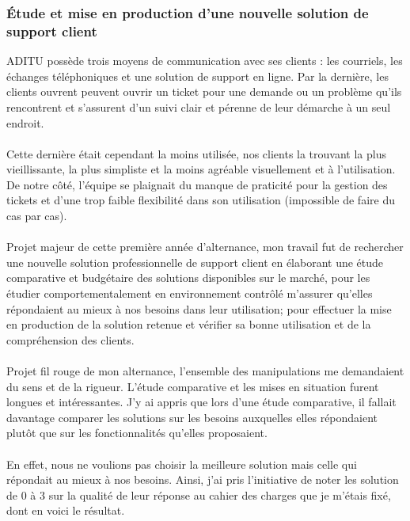 \subsubsection{Étude et mise en production d'une nouvelle solution de support client}

ADITU possède trois moyens de communication avec ses clients : les courriels, les échanges téléphoniques et une solution de support en ligne. Par la dernière, les clients ouvrent peuvent ouvrir un ticket pour une demande ou un problème qu'ils rencontrent et s'assurent d'un suivi clair et pérenne de leur démarche à un seul endroit.
\\ \\
Cette dernière était cependant la moins utilisée, nos clients la trouvant la plus vieillissante, la plus simpliste et la moins agréable visuellement et à l’utilisation. De notre côté, l'équipe se plaignait du manque de praticité pour la gestion des tickets et d’une trop faible flexibilité dans son utilisation (impossible de faire du cas par cas).
\\ \\
Projet majeur de cette première année d'alternance, mon travail fut de rechercher une nouvelle solution professionnelle de support client en élaborant une étude comparative et budgétaire des solutions disponibles sur le marché, pour les étudier comportementalement en environnement contrôlé m'assurer qu'elles répondaient au mieux à nos besoins dans leur utilisation; pour effectuer la mise en production de la solution retenue et vérifier sa bonne utilisation et de la compréhension des clients.
\\ \\
Projet fil rouge de mon alternance, l'ensemble des manipulations me demandaient du sens et de la rigueur. L'étude comparative et les mises en situation furent longues et intéressantes. J'y ai appris que lors d'une étude comparative, il fallait davantage comparer les solutions sur les besoins auxquelles elles répondaient plutôt que sur les fonctionnalités qu'elles proposaient.
\\ \\
En effet, nous ne voulions pas choisir la meilleure solution mais celle qui répondait au mieux à nos besoins. Ainsi, j'ai pris l'initiative de noter les solution de 0 à 3 sur la qualité de leur réponse au cahier des charges que je m'étais fixé, dont en voici le résultat.

